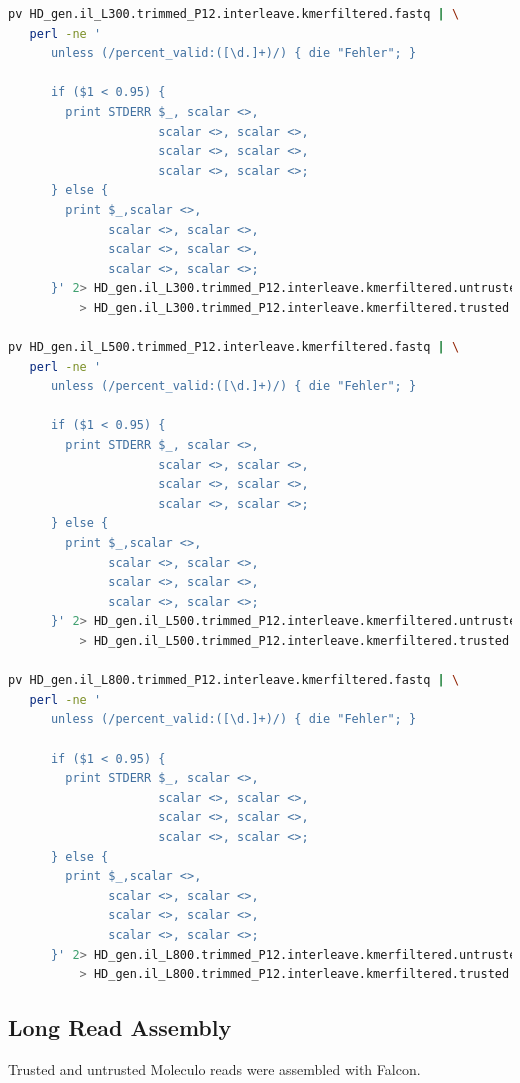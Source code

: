 \documentclass[12pt,a4paper]{scrartcl}
\begin{document}
\begin{lstlisting}[language=bash]
pv HD_gen.il_L300.trimmed_P12.interleave.kmerfiltered.fastq | \
   perl -ne '
      unless (/percent_valid:([\d.]+)/) { die "Fehler"; }

      if ($1 < 0.95) {
        print STDERR $_, scalar <>,
                     scalar <>, scalar <>,
                     scalar <>, scalar <>,
                     scalar <>, scalar <>;
      } else {
        print $_,scalar <>,
              scalar <>, scalar <>,
              scalar <>, scalar <>,
              scalar <>, scalar <>;
      }' 2> HD_gen.il_L300.trimmed_P12.interleave.kmerfiltered.untrusted.fastq \
          > HD_gen.il_L300.trimmed_P12.interleave.kmerfiltered.trusted.fastq

pv HD_gen.il_L500.trimmed_P12.interleave.kmerfiltered.fastq | \
   perl -ne '
      unless (/percent_valid:([\d.]+)/) { die "Fehler"; }

      if ($1 < 0.95) {
        print STDERR $_, scalar <>,
                     scalar <>, scalar <>,
                     scalar <>, scalar <>,
                     scalar <>, scalar <>;
      } else {
        print $_,scalar <>,
              scalar <>, scalar <>,
              scalar <>, scalar <>,
              scalar <>, scalar <>;
      }' 2> HD_gen.il_L500.trimmed_P12.interleave.kmerfiltered.untrusted.fastq \
          > HD_gen.il_L500.trimmed_P12.interleave.kmerfiltered.trusted.fastq

pv HD_gen.il_L800.trimmed_P12.interleave.kmerfiltered.fastq | \
   perl -ne '
      unless (/percent_valid:([\d.]+)/) { die "Fehler"; }

      if ($1 < 0.95) {
        print STDERR $_, scalar <>,
                     scalar <>, scalar <>,
                     scalar <>, scalar <>,
                     scalar <>, scalar <>;
      } else {
        print $_,scalar <>,
              scalar <>, scalar <>,
              scalar <>, scalar <>,
              scalar <>, scalar <>;
      }' 2> HD_gen.il_L800.trimmed_P12.interleave.kmerfiltered.untrusted.fastq \
          > HD_gen.il_L800.trimmed_P12.interleave.kmerfiltered.trusted.fastq
\end{lstlisting}

\subsection*{Long Read Assembly}

Trusted and untrusted Moleculo reads were assembled with Falcon.
\end{document}
